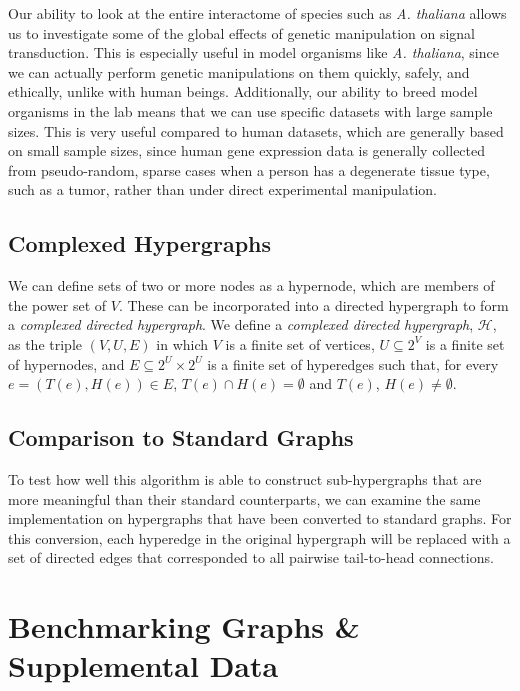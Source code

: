 \documentclass[12pt,twoside]{reedthesis}
\theoremstyle{definition}
\begin{document}
   Our ability to look at the entire interactome of species such as \textit{A. thaliana} allows us to investigate some of the global effects of genetic manipulation on signal transduction. This is especially useful in model organisms like \textit{A. thaliana}, since we can actually perform genetic manipulations on them quickly, safely, and ethically, unlike with human beings. Additionally, our ability to breed model organisms in the lab means that we can use specific datasets with large sample sizes. This is very useful compared to human datasets, which are generally based on small sample sizes, since human gene expression data is generally collected from pseudo-random, sparse cases when a person has a degenerate tissue type, such as a tumor, rather than under direct experimental manipulation.\par

   \section{Complexed Hypergraphs}

   We can define sets of two or more nodes as a hypernode, which are members of the power set of $V$.  These can be incorporated into a directed hypergraph to form a \textit{complexed directed hypergraph}.  We define a \textit{complexed directed hypergraph}, $\mathcal{H}$, as the triple $(V,U,E)$ in which $V$ is a finite set of vertices, $U \subseteq 2^V$ is a finite set of hypernodes, and $E \subseteq 2^U \times 2^U$ is a finite set of hyperedges such that, for every $e=(T(e),H(e)) \in E$, $T(e) \cap H(e) = \emptyset$ and $T(e)$, $H(e) \neq \emptyset$.\par

   \section{Comparison to Standard Graphs}

   To test how well this algorithm is able to construct sub-hypergraphs that are more meaningful than their standard counterparts, we can examine the same implementation on hypergraphs that have been converted to standard graphs. For this conversion, each hyperedge in the original hypergraph will be replaced with a set of directed edges that corresponded to all pairwise tail-to-head connections.


    \appendix
      \chapter{Benchmarking Graphs \& Supplemental Data}
\end{document}
